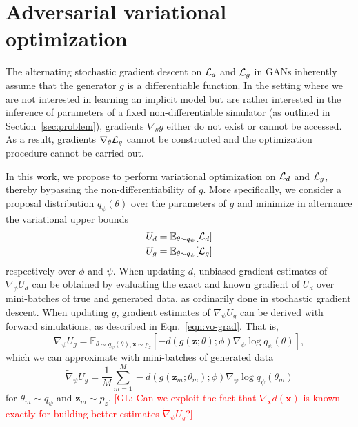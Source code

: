 \documentclass[twocolumn,superscriptaddress,aps]{revtex4-1}
\newcommand{\glnote}[1]{\textcolor{red}{[GL: #1]}}
\theoremstyle{plain}
\begin{document}

\section{Adversarial variational optimization}

The alternating stochastic gradient descent on ${\cal L}_d$ and ${\cal L}_g$ in
GANs inherently assume that the generator $g$ is a differentiable function. In
the setting where we are not interested in learning an implicit model but are
rather interested in the inference of parameters of a fixed
non-differentiable simulator (as outlined in Section~\ref{sec:problem}),
gradients $\nabla_\theta g$ either do not exist or cannot be accessed. As a
result, gradients $\nabla_\theta {\cal L}_g$ cannot be constructed and the
optimization procedure cannot be carried out.

In this work, we propose to perform variational optimization
on ${\cal L}_d$ and ${\cal L}_g$, thereby bypassing the non-differentiability
of $g$. More specifically, we consider a proposal distribution $q_\psi(\theta)$
over the parameters of $g$ and minimize in alternance the variational upper bounds
\begin{align}
    U_d &= \mathbb{E}_{\theta \sim q_\psi} [ {\cal L}_d ] \label{eqn:vo-ud} \\
    U_g &= \mathbb{E}_{\theta \sim q_\psi} [ {\cal L}_g ] \label{eqn:vo-ug}
\end{align}
respectively over $\phi$ and $\psi$.
When updating $d$, unbiased gradient estimates of $\nabla_\phi U_d$ can be
obtained by evaluating the exact and known gradient of $U_d$ over
mini-batches of true and generated data, as ordinarily
done in stochastic gradient descent. When updating $g$, gradient estimates
of $\nabla_\psi U_g$ can be derived with forward simulations, as described in Eqn.~\ref{eqn:vo-grad}.
That is,
\begin{equation}
    \nabla_\psi U_g = \mathbb{E}_{\theta \sim q_\psi(\theta), \mathbf{z} \sim p_z}  [-d(g(\mathbf{z};\theta);\phi) \nabla_\psi \log q_\psi(\theta)],
\end{equation}
which we can approximate with mini-batches of generated data
\begin{equation}
    \tilde{\nabla}_\psi U_g = \frac{1}{M} \sum_{m=1}^M -d(g(\mathbf{z}_m; \theta_m); \phi) \nabla_\psi \log q_\psi(\theta_m)
\end{equation}
for $\theta_m \sim q_\psi$ and $\mathbf{z}_m \sim p_z$.
\glnote{Can we exploit the fact that $\nabla_\mathbf{x} d(\mathbf{x})$ is known exactly for building better estimates $\tilde{\nabla}_\psi U_g$?}
\end{document}
